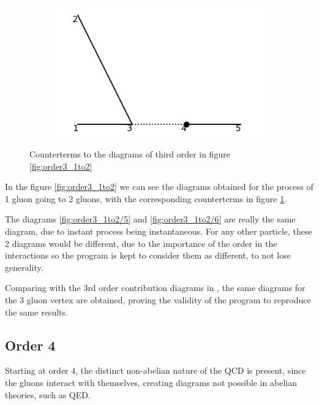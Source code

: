 \documentclass[11pt,a4paper,twoside,pdf]{article}
\numberwithin{equation}{section}
\begin{document}
\begin{figure}[h!]
\begin{subfigure}[t]{0.24\textwidth}
        \caption{ }
    \end{subfigure}
    \hfill
    \begin{subfigure}[t]{0.24\textwidth}
        \centering
        \includegraphics[width=\textwidth]{plots/order3/order3_1to2/counterterms/4.png}
        \caption{ }
    \end{subfigure}
    \caption{Counterterms to the diagrams of third order in figure \ref{fig:order3_1to2}}
    \label{fig:order3_1to2/counterterms}
\end{figure}


In the figure \ref{fig:order3_1to2} we can see the diagrams obtained for the process
of 1 gluon going to 2 gluons, with the corresponding counterterms in figure
\ref{fig:order3_1to2/counterterms}. 

The diagrams \ref{fig:order3_1to2/5} and \ref{fig:order3_1to2/6} are really the same 
diagram, due to instant process being instantaneous. For any other particle, these 
2 diagrams would be different, due to the importance of the order in the interactions
so the program is kept to consider them as different, to not lose generality.

Comparing with the 3rd order contribution diagrams in \cite{QCDG}, the same diagrams
for the 3 gluon vertex are obtained, proving the validity of the program to reproduce the same results.



\subsection{Order 4}

Starting at order 4, the distinct non-abelian nature of the QCD is present, since 
the gluons interact with themselves, creating diagrams not possible in abelian theories, 
such as QED.
\end{document}
